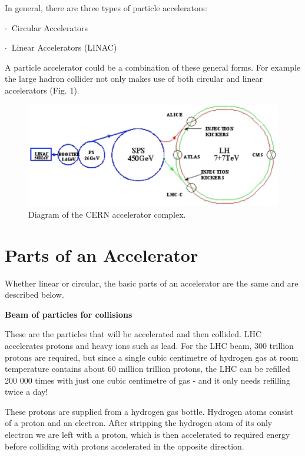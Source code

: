 \;

In general, there are three types of particle accelerators: 

\;

          $ \cdot \:$  Circular Accelerators

	  $ \cdot \:$  Linear Accelerators (LINAC)

\;
\noindent
A particle accelerator could be a combination of these general forms. For example the large hadron collider not only makes use of both circular and linear accelerators (Fig. 1).

\;
\;

\begin{figure}[h]
\centering\includegraphics[scale=0.5]{./Particleaccelerators/Pictures/fig1.pdf}
\caption{Diagram of the CERN accelerator complex.}
\label{fig:pdgdedx}
\end{figure}

\section{Parts of an Accelerator}

Whether linear or circular, the basic parts of an accelerator are the same and are described below.

\;
\;
\;

\noindent
\textbf{Beam of particles for collisions}

\;
\;

\noindent
These are the particles that will be accelerated and then collided. LHC accelerates protons and heavy ions such as lead. For the LHC beam, 300 trillion protons are required, but since a single cubic centimetre of hydrogen gas at room temperature contains about 60 million trillion protons, the LHC can be refilled 200 000 times with just one cubic centimetre of gas - and it only needs refilling twice a day!

\;
\noindent
These protons are supplied from a hydrogen gas bottle. Hydrogen atoms consist of a proton and an electron. After stripping the hydrogen atom of its only electron we are left with a proton, which is then accelerated to required energy before colliding with protons accelerated in the opposite direction.

